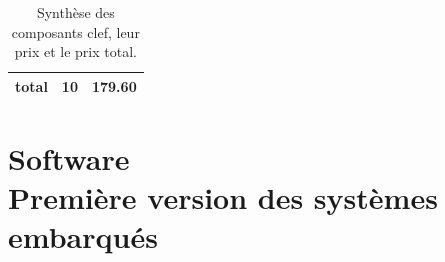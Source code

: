 \documentclass[a4paper,11pt]{report}
\begin{document}
{\begin{centering}
\begin{table}
\begin{tabular}{| l | c | r |}
\hline
\hline
total & 10 & 179.60\\
\hline

\end{tabular}
\caption{\label{TableCout}Synthèse des composants clef, leur prix et le prix total.}
\end{table}
\end{centering}





\chapter{Software \\  Première version des systèmes embarqués}

}
\end{document}
